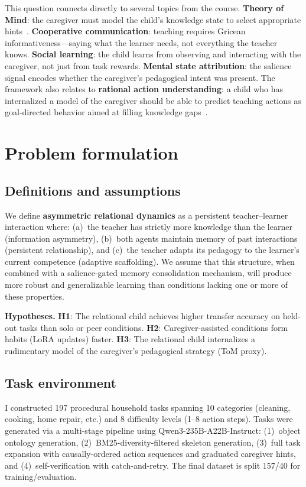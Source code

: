 \documentclass{article}
\begin{document}
This question connects directly to several topics from the course. \textbf{Theory of Mind}: the caregiver must model the child's knowledge state to select appropriate hints~\citep{baker2017rational}. \textbf{Cooperative communication}: teaching requires Gricean informativeness---saying what the learner needs, not everything the teacher knows. \textbf{Social learning}: the child learns from observing and interacting with the caregiver, not just from task rewards. \textbf{Mental state attribution}: the salience signal encodes whether the caregiver's pedagogical intent was present. The framework also relates to \textbf{rational action understanding}: a child who has internalized a model of the caregiver should be able to predict teaching actions as goal-directed behavior aimed at filling knowledge gaps~\citep{baker2017rational}.

\section{Problem formulation}

\subsection{Definitions and assumptions}

We define \textbf{asymmetric relational dynamics} as a persistent teacher--learner interaction where: (a)~the teacher has strictly more knowledge than the learner (information asymmetry), (b)~both agents maintain memory of past interactions (persistent relationship), and (c)~the teacher adapts its pedagogy to the learner's current competence (adaptive scaffolding). We assume that this structure, when combined with a salience-gated memory consolidation mechanism, will produce more robust and generalizable learning than conditions lacking one or more of these properties.

\textbf{Hypotheses.} \textbf{H1}: The relational child achieves higher transfer accuracy on held-out tasks than solo or peer conditions. \textbf{H2}: Caregiver-assisted conditions form habits (LoRA updates) faster. \textbf{H3}: The relational child internalizes a rudimentary model of the caregiver's pedagogical strategy (ToM proxy).

\subsection{Task environment}

I constructed 197 procedural household tasks spanning 10 categories (cleaning, cooking, home repair, etc.) and 8 difficulty levels (1--8 action steps). Tasks were generated via a multi-stage pipeline using Qwen3-235B-A22B-Instruct: (1)~object ontology generation, (2)~BM25-diversity-filtered skeleton generation, (3)~full task expansion with causally-ordered action sequences and graduated caregiver hints, and (4)~self-verification with catch-and-retry. The final dataset is split 157/40 for training/evaluation.
\end{document}
